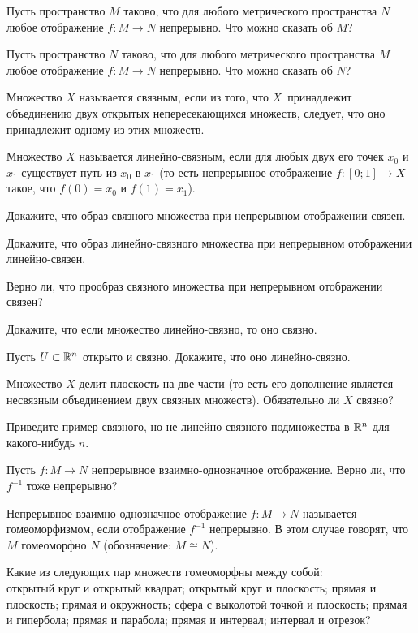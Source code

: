 \documentclass[a4paper,12pt]{article}
\begin{document}
Пусть пространство $M$ таково, что для любого метрического пространства $N$ любое отображение $f \colon M \to N$ непрерывно. Что можно сказать об $M$?

Пусть пространство $N$ таково, что для любого метрического пространства $M$ любое отображение $f \colon M \to N$ непрерывно. Что можно сказать об $N$?

\newpage

Множество $X$ называется  связным, если из того, что $X$~принадлежит объединению двух открытых непересекающихся множеств, следует, что оно принадлежит одному из этих множеств.

Множество $X$ называется  линейно-связным, если для любых двух его точек $x_0$ и $x_1$ существует путь из $x_0$ в $x_1$ (то есть непрерывное отображение $f \colon [0;1] \to X$ такое, что $f(0) = x_0$ и $f(1) = x_1$).

Докажите, что образ связного множества при непрерывном отображении связен.

Докажите, что образ линейно-связного множества при непрерывном отображении линейно-связен.

Верно ли, что прообраз связного множества при непрерывном отображении связен?

Докажите, что если множество линейно-связно, то оно связно.

Пусть $U \subset \mathbb{R}^n$ открыто и связно. Докажите, что оно линейно-связно.

Множество $X$ делит плоскость на две части (то есть его дополнение является несвязным объединением двух связных множеств). Обязательно ли $X$ связно?

Приведите пример связного, но не линейно-связного подмножества в $\mathbb{R}^n$ для какого-нибудь $n$.

Пусть $f \colon M \to N$ непрерывное взаимно-однозначное отображение. Верно ли, что $f^{-1}$ тоже непрерывно?

Непрерывное взаимно-однозначное отображение $f \colon M \to N$ называется  гомеоморфизмом, если отображение $f^{-1}$ непрерывно. В этом случае говорят, что $M$  гомеоморфно $N$ (обозначение: $M \cong N$).

Какие из следующих пар множеств гомеоморфны между собой:\\
открытый круг и открытый квадрат;
открытый круг и плоскость;
прямая и плоскость;
прямая и окружность;
сфера с выколотой точкой и плоскость;
прямая и гипербола;
прямая и парабола;
прямая и интервал;
интервал и отрезок?
\end{document}
